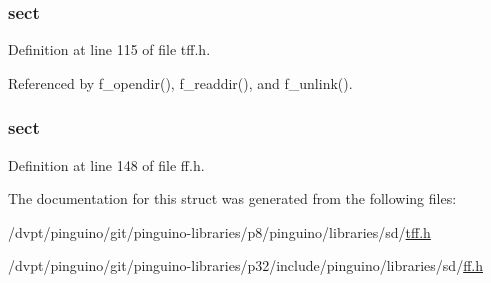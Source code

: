\hypertarget{struct_d_i_r_aa7c560f325cb4d59f40dc8cf731b6e22}{
\subsubsection[{sect}]{ sect}}\label{struct_d_i_r_aa7c560f325cb4d59f40dc8cf731b6e22}


Definition at line 115 of file tff.\-h.



Referenced by f\-\_\-opendir(), f\-\_\-readdir(), and f\-\_\-unlink().

\hypertarget{struct_d_i_r_a3e49e0860170e0fd9fc3e891b0d59975}{
\subsubsection[{sect}]{ sect}}\label{struct_d_i_r_a3e49e0860170e0fd9fc3e891b0d59975}


Definition at line 148 of file ff.\-h.



The documentation for this struct was generated from the following files\-:\begin{DoxyCompactItemize}
\item 
/dvpt/pinguino/git/pinguino-\/libraries/p8/pinguino/libraries/sd/\hyperlink{tff_8h}{tff.\-h}\item 
/dvpt/pinguino/git/pinguino-\/libraries/p32/include/pinguino/libraries/sd/\hyperlink{ff_8h}{ff.\-h}\end{DoxyCompactItemize}

